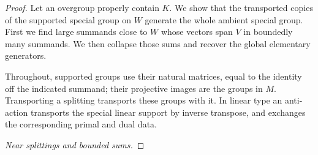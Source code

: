 \begin{proof}

Let an overgroup properly contain \(K\).  We show that the transported
copies of the supported special group on \(W\) generate the whole
ambient special group.  First we find large summands close to \(W\)
whose vectors span \(V\) in boundedly many summands.  We then collapse
those sums and recover the global elementary generators.

Throughout, supported groups use their natural matrices, equal to the
identity off the indicated summand; their projective images are the
groups in \(M\).  Transporting a splitting transports these groups
with it.  In linear type an anti-action transports the special linear
support by inverse transpose, and exchanges the corresponding primal
and dual data.

\smallskip\noindent\emph{Near splittings and bounded sums.}


\end{proof}
